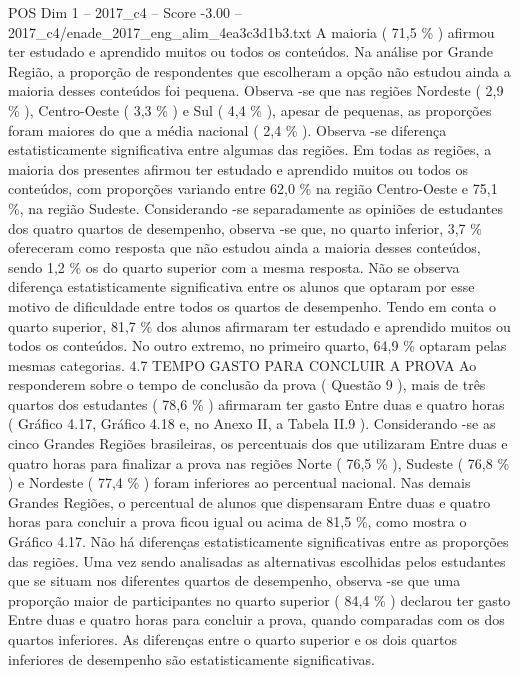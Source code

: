 \begin{textsample}{POS Dim 1 – 2017\_c4 – Score -3.00 – 2017\_c4/enade\_2017\_eng\_alim\_4ea3c3d1b3.txt}
A maioria ( 71,5 \% ) afirmou ter estudado e aprendido muitos ou todos os conteúdos.
Na análise por Grande Região, a proporção de respondentes que escolheram a opção não estudou ainda a maioria desses conteúdos foi pequena.
Observa -se que nas regiões Nordeste ( 2,9 \% ), Centro-Oeste ( 3,3 \% ) e Sul ( 4,4 \% ), apesar de pequenas, as proporções foram maiores do que a média nacional ( 2,4 \% ).
Observa -se diferença estatisticamente significativa entre algumas das regiões.
Em todas as regiões, a maioria dos presentes afirmou ter estudado e aprendido muitos ou todos os conteúdos, com proporções variando entre 62,0 \% na região Centro-Oeste e 75,1 \%, na região Sudeste.
Considerando -se separadamente as opiniões de estudantes dos quatro quartos de desempenho, observa -se que, no quarto inferior, 3,7 \% ofereceram como resposta que não estudou ainda a maioria desses conteúdos, sendo 1,2 \% os do quarto superior com a mesma resposta.
Não se observa diferença estatisticamente significativa entre os alunos que optaram por esse motivo de dificuldade entre todos os quartos de desempenho.
Tendo em conta o quarto superior, 81,7 \% dos alunos afirmaram ter estudado e aprendido muitos ou todos os conteúdos.
No outro extremo, no primeiro quarto, 64,9 \% optaram pelas mesmas categorias. 4.7 TEMPO GASTO PARA CONCLUIR A PROVA Ao responderem sobre o tempo de conclusão da prova ( Questão 9 ), mais de três quartos dos estudantes ( 78,6 \% ) afirmaram ter gasto Entre duas e quatro horas ( Gráfico 4.17, Gráfico 4.18 e, no Anexo II, a Tabela II.9 ).
Considerando -se as cinco Grandes Regiões brasileiras, os percentuais dos que utilizaram Entre duas e quatro horas para finalizar a prova nas regiões Norte ( 76,5 \% ), Sudeste ( 76,8 \% ) e Nordeste ( 77,4 \% ) foram inferiores ao percentual nacional.
Nas demais Grandes Regiões, o percentual de alunos que dispensaram Entre duas e quatro horas para concluir a prova ficou igual ou acima de 81,5 \%, como mostra o Gráfico 4.17.
Não há diferenças estatisticamente significativas entre as proporções das regiões.
Uma vez sendo analisadas as alternativas escolhidas pelos estudantes que se situam nos diferentes quartos de desempenho, observa -se que uma proporção maior de participantes no quarto superior ( 84,4 \% ) declarou ter gasto Entre duas e quatro horas para concluir a prova, quando comparadas com os dos quartos inferiores.
As diferenças entre o quarto superior e os dois quartos inferiores de desempenho são estatisticamente significativas.

\end{textsample}
